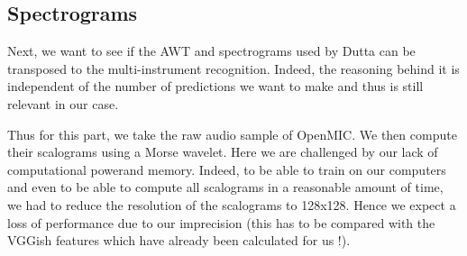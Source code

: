 \documentclass[final]{cvpr}
\begin{document}
\subsection{Spectrograms}
Next, we want to see if the AWT and spectrograms used by Dutta \etal can be transposed to the multi-instrument recognition. Indeed, the reasoning behind it is independent of the number of predictions we want to make and thus is still relevant in our case. 

Thus for this part, we take the raw audio sample of OpenMIC. We then compute their scalograms using a Morse wavelet. Here we are challenged by our lack of computational powerand memory. Indeed, to be able to train on our computers and even to be able to compute all scalograms in a reasonable amount of time, we had to reduce the resolution of the scalograms to 128x128. Hence we expect a loss of performance due to our imprecision (this has to be compared with the VGGish features which have already been calculated for us !).
\end{document}
